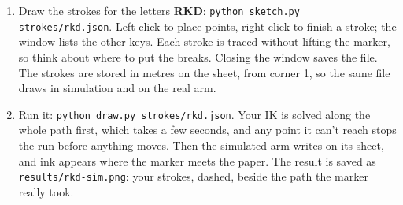 \documentclass{16384_doc}
\begin{document}
\begin{questions}
\begin{enumerate}[label=\alph*.]
\begin{enumerate}[label=(\roman*)]
                  each corner with the keyboard (the keys are in part (c)),
                  while it tells you how far the tip is from the paper.
            \item Draw the strokes for the letters \textbf{RKD}:
                  \verb!python sketch.py strokes/rkd.json!.  Left-click to place
                  points, right-click to finish a stroke; the window lists the
                  other keys.  Each stroke is traced without lifting the marker,
                  so think about where to put the breaks.  Closing the window
                  saves the file.  The strokes are stored in metres on the sheet,
                  from corner 1, so the same file draws in simulation and on the
                  real arm.
            \item Run it: \verb!python draw.py strokes/rkd.json!.  Your IK is
                  solved along the whole path first, which takes a few seconds,
                  and any point it can't reach stops the run before anything
                  moves.  Then the simulated arm writes on its sheet, and ink
                  appears where the marker meets the paper.  The result is saved
                  as \verb!results/rkd-sim.png!: your strokes, dashed, beside the
                  path the marker really took.
        \end{enumerate}


\end{enumerate}
\end{questions}
\end{document}
